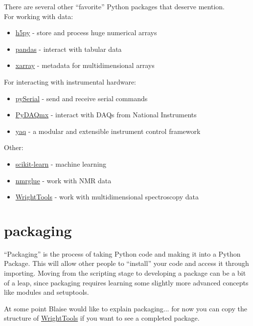 \documentclass{training}
\begin{document}
There are several other ``favorite'' Python packages that deserve mention. \\
For working with data:
\begin{itemize}
  \item \href{https://www.h5py.org/}{h5py} - store and process huge numerical arrays
  \item \href{https://pandas.pydata.org/}{pandas} - interact with tabular data
  \item \href{http://xarray.pydata.org/en/stable/}{xarray} - metadata for multidimensional arrays
\end{itemize}
For interacting with instrumental hardware:
\begin{itemize}
  \item \href{https://pythonhosted.org/pyserial/}{pySerial} - send and receive serial commands
  \item \href{https://pythonhosted.org/PyDAQmx/}{PyDAQmx} - interact with DAQs from National Instruments
  \item \href{https://yaq.fyi/}{yaq} - a modular and extensible instrument control framework
\end{itemize}
Other:
\begin{itemize}
  \item \href{https://scikit-learn.org/stable/index.html}{scikit-learn} - machine learning
  \item \href{https://www.nmrglue.com/}{nmrglue} - work with NMR data
  \item \href{http://wright.tools/}{WrightTools} - work with multidimensional spectroscopy data
\end{itemize}

\clearpage
\section{packaging}

``Packaging'' is the process of taking Python code and making it into a Python Package.
This will allow other people to ``install'' your code and access it through importing.
Moving from the scripting stage to developing a package can be a bit of a leap, since packaging requires learning some slightly more advanced concepts like modules and setuptools.

At some point Blaise would like to explain packaging... for now you can copy the structure of \href{https://github.com/wright-group/WrightTools}{WrightTools} if you want to see a completed package.
\end{document}
